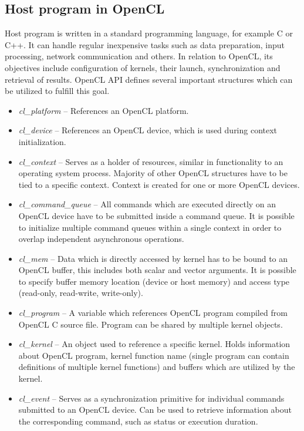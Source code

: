 \documentclass
[
    digital, %
    oneside, %
    table, %
    nolof, %
    nolot, %
    nocover %
]{fithesis3}
\begin{document}
\subsection{Host program in OpenCL}
Host program is written in a standard programming language, for example C or C++. It can handle regular inexpensive tasks such as data preparation,
input processing, network communication and others. In relation to OpenCL, its objectives include configuration of kernels, their launch,
synchronization and retrieval of results. OpenCL API defines several important structures which can be utilized to fulfill this goal.
\begin{itemize}
    \item \textit{cl\_platform} -- References an OpenCL platform.
    \item \textit{cl\_device} -- References an OpenCL device, which is used during context initialization.
    \item \textit{cl\_context} -- Serves as a holder of resources, similar in functionality to an operating system process. Majority of other OpenCL
    structures have to be tied to a specific context. Context is created for one or more OpenCL devices.
    \item \textit{cl\_command\_queue} -- All commands which are executed directly on an OpenCL device have to be submitted inside a command queue. It
    is possible to initialize multiple command queues within a single context in order to overlap independent asynchronous operations.
    \item \textit{cl\_mem} -- Data which is directly accessed by kernel has to be bound to an OpenCL buffer, this includes both scalar and vector
    arguments. It is possible to specify buffer memory location (device or host memory) and access type (read-only, read-write, write-only).
    \item \textit{cl\_program} -- A variable which references OpenCL program compiled from OpenCL C source file. Program can be shared by multiple
    kernel objects.
    \item \textit{cl\_kernel} -- An object used to reference a specific kernel. Holds information about OpenCL program, kernel function name (single
    program can contain definitions of multiple kernel functions) and buffers which are utilized by the kernel.
    \item \textit{cl\_event} -- Serves as a synchronization primitive for individual commands submitted to an OpenCL device. Can be used to retrieve
    information about the corresponding command, such as status or execution duration.
\end{itemize}
\end{document}
